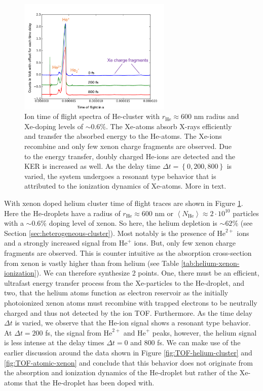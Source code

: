 \begin{figure}
	\centering
		\includegraphics[width=0.65\textwidth]{images/results/TOF-helium-xenon-cluster-60.png}
	\caption[TOF spectra of HeXe-clusters with $\sim 0.6\%$ Xe-doping at various delays $\Delta t$.]{Ion time of flight spectra of He-cluster with $r_{\text{He}}\approx 600$ nm radius and Xe-doping levels of $\sim 0.6\%$. The Xe-atoms absorb X-rays efficiently and transfer the absorbed energy to the He-atoms. The Xe-ions recombine and only few xenon charge fragments are observed. Due to the energy transfer, doubly charged He-ions are detected and the KER is increased as well. As the delay time $\Delta t=\left\{0,200,800\right\}$ is varied, the system undergoes a resonant type behavior that is attributed to the ionization dynamics of Xe-atoms. More in text.}
	\label{fig:TOF-helium-xenon-cluster-60}
\end{figure}
With xenon doped helium cluster time of flight traces are shown in Figure \ref{fig:TOF-helium-xenon-cluster-60}. Here the He-droplets have a radius of $r_{\text{He}}\approx 600$ nm or $\left\langle N_{\text{He}}\right\rangle\approx 2\cdot 10^{10}$ particles with a $\sim 0.6\%$ doping level of xenon. So here, the helium depletion is $\sim 62\%$ (see Section \ref{sec:heterogeneous-cluster}). Most notably is the presence of $\text{He}^{2+}$ ions and a strongly increased signal from $\text{He}^{+}$ ions. But, only few xenon charge fragments are observed. This is counter intuitive as the absorption cross-section from xenon is vastly higher than from helium (see Table \ref{tab:helium-xenon-ionization}). We can therefore synthesize 2 points. One, there must be an efficient, ultrafast energy transfer process from the Xe-particles to the He-droplet, and two, that the helium atoms function as electron reservoir as the initially photoionized xenon atoms must recombine with trapped electrons to be neutrally charged and thus not detected by the ion TOF. Furthermore. As the time delay $\Delta t$ is varied, we observe that the He-ion signal shows a resonant type behavior. At $\Delta t = 200$ fs, the signal from $\text{He}^{2+}$ and $\text{He}^{+}$ peaks, however, the helium signal is less intense at the delay times $\Delta t = 0$ and 800 fs. We can make use of the earlier discussion around the data shown in Figure \ref{fig:TOF-helium-cluster} and \ref{fig:TOF-atomic-xenon} and conclude that this behavior does not originate from the absorption and ionization dynamics of the He-droplet but rather of the Xe-atoms that the He-droplet has been doped with.\\
